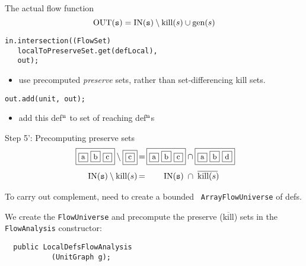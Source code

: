 \begin{slide}{The actual flow function}
\vspace*{-0.2in}
\[ \mbox{OUT}(\mbox{\tt s}) = \mbox{IN}(\mbox{\tt s}) \setminus 
               \mbox{kill}(s) \cup \mbox{gen}(s) \]
\vspace{-0.15in}

\begin{verbatim}
in.intersection((FlowSet)
   localToPreserveSet.get(defLocal), 
   out);
\end{verbatim}
\begin{itemize}
\item use precomputed {\em preserve} sets, rather than
set-differencing kill sets.
\end{itemize}

\begin{verbatim}
out.add(unit, out);
\end{verbatim}

\begin{itemize}
\item add this def$^{\mbox{\scriptsize n}}$ to set of reaching
def$^{\mbox{\scriptsize n}}$s
\end{itemize}
\end{slide}

\begin{slide}{Step 5': Precomputing preserve sets}
\vspace*{-0.2in}
\[ \begin{array}{r@{\,}c@{\,}c@{\,}l}
\fbox{\small \fbox{a} \fbox{b} \fbox{c}} \setminus 
                     \fbox{\small \fbox{c}} &=& 
    \fbox{\small \fbox{a} \fbox{b} \fbox{c}} \cap 
                      \fbox{\small \fbox{a} \fbox{b} \fbox{d}}\vspace*{0.1in} \\ 
\mbox{IN}(\mbox{\tt s}) \setminus \mbox{kill}(s) &=& \mbox{IN}(\mbox{\tt s}) \; \cap \; \overline{\mbox{kill}(s)\!}
\end{array} \]

To carry out complement, need to create a bounded {\tt
ArrayFlowUniverse} of defs.

\vspace*{0.09in}

We create the {\tt FlowUniverse} and precompute the preserve ($\overline{\mbox{kill}}$) sets in
the {\tt FlowAnalysis} constructor:
\begin{verbatim}
  public LocalDefsFlowAnalysis
           (UnitGraph g);
\end{verbatim}
\end{slide}

